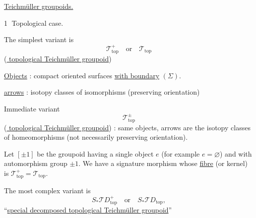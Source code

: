 \uline{Teichmüller groupoids.}

\textcircled{1} Topological case.

The simplest variant is
\[
\mathcal T^+_{\mathrm{top}}\quad\text{or}\quad\mathcal T_{\mathrm{top}}
\]
(\uline{ topological Teichmüller groupoid})

\uline{Objects} : compact oriented surfaces \uline{with boundary} $(\Sigma)$.

\uline{arrows} : isotopy classes of isomorphisms (preserving orientation)


Immediate variant
\[
\mathcal T_{\mathrm{top}}^\pm
\]
(\uline{ topological Teichmüller groupoid}) :
same objects, arrows are the isotopy classes of homeomorphisms
(not necessarily preserving orientation).

Let $[\pm1]$ be the groupoid having a single object $e$ (for example $e=\varnothing$)
and with automorphism group $\pm1$. We have a signature morphism
whose \uline{fibre}  (or kernel) is
$\mathcal T_{\mathrm{top}}^+=\mathcal T_{\mathrm{top}}$.

The most complex variant is
\[
S_*\mathcal TD_{\mathrm{top}}^+\quad\text{or}\quad
S_*\mathcal TD_{\mathrm{top}},
\]
``\uline{special decomposed  topological Teichmüller groupoid}''
